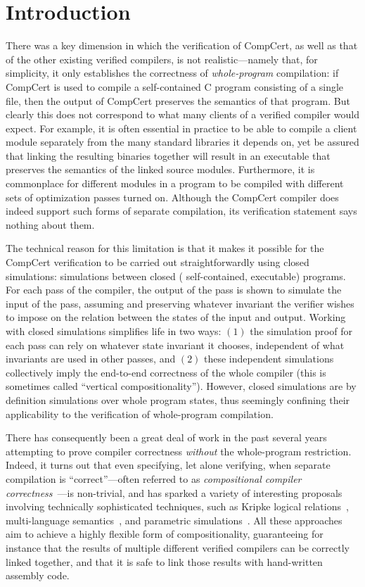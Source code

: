 \section{Introduction}
\label{sec:sepcomp:introduction}

There was a key dimension in which the verification of CompCert, as well as that of the other
existing verified compilers, is not realistic---namely that, for simplicity, it only establishes the
correctness of \emph{whole-program} compilation: if CompCert is used to compile a self-contained C
program consisting of a single file, then the output of CompCert preserves the semantics of that
program.  But clearly this does not correspond to what many clients of a verified compiler would
expect.  For example, it is often essential in practice to be able to compile a client module
separately from the many standard libraries it depends on, yet be assured that linking the resulting
binaries together will result in an executable that preserves the semantics of the linked source
modules.  Furthermore, it is commonplace for different modules in a program to be compiled with
different sets of optimization passes turned on.  Although the CompCert compiler does indeed support
such forms of separate compilation, its verification statement says nothing about them.

The technical reason for this limitation is that it makes it possible for the CompCert verification
to be carried out straightforwardly using closed simulations: simulations between closed (\ie
self-contained, executable) programs.  For each pass of the compiler, the output of the pass is
shown to simulate the input of the pass, assuming and preserving whatever invariant the verifier
wishes to impose on the relation between the states of the input and output.  Working with closed
simulations simplifies life in two ways: $(1)$ the simulation proof for each pass can rely on
whatever state invariant it chooses, independent of what invariants are used in other passes, and
$(2)$ these independent simulations collectively imply the end-to-end correctness of the whole
compiler (this is sometimes called ``vertical compositionality'').  However, closed simulations are
by definition simulations over whole program states, thus seemingly confining their applicability to
the verification of whole-program compilation.

There has consequently been a great deal of work in the past several years attempting to prove
compiler correctness \emph{without} the whole-program restriction.  Indeed, it turns out that even
specifying, let alone verifying, when separate compilation is ``correct''---often referred to as
\emph{compositional compiler correctness}~\cite{benton+:icfp09}---is non-trivial, and has sparked a
variety of interesting proposals involving technically sophisticated techniques, such as Kripke
logical relations~\cite{hur+:popl11}, multi-language semantics~\cite{perconti+:esop14}, and
parametric simulations~\cite{hur+:popl12,neis+:icfp15}.  All these approaches aim to achieve a
highly flexible form of compositionality, guaranteeing for instance that the results of multiple
different verified compilers can be correctly linked together, and that it is safe to link those
results with hand-written assembly code.

